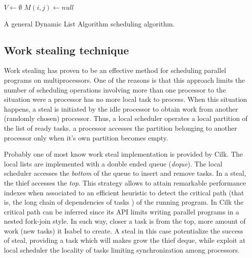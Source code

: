 \documentclass{sig-alternate}
\begin{document}
\begin{algorithm} \label{algo:dls}


 $V \longleftarrow \emptyset$  
 $M(i,j) \longleftarrow null$     
 
\caption{A general Dynamic List Algorithm scheduling algorithm.}
\end{algorithm}

\subsection{Work stealing technique}
  
Work stealing has proven \cite{blelloch} to be an effective method for scheduling parallel programs on multiprocessors. One of the reasons is that this approach limits the number of scheduling operations involving more than one processor to the situation were a processor has no more local task to process. When this situation happens, a steal is initiated by the idle processor to obtain work from another (randomly chosen) processor. Thus, a local scheduler operates a local partition of the list of ready tasks. a processor accesses the partition belonging to another processor only when it's own partition becomes empty.
 
Probably one of most know work steal implementation is provided by Cilk. The local lists are implemented with a double ended queue ({\em deque}). The local scheduler accesses the {\em bottom} of the queue to insert and remove tasks. In a steal, the thief accesses the {\em top}. This strategy allows to attain remarkable performance indexes when associated to an efficient heuristic to detect the critical path (that is, the long chain of dependencies of tasks \cite{Graham}) of the running program. In Cilk the critical path can be inferred since its API limits writing parallel programs in a nested fork-join style. In such way, closer a task is from the top, more amount of work (new tasks) it Isabel to create. A steal in this case potentialize the success of steal, providing a task which will makes grow the thief deque, while exploit at local scheduler the locality of tasks limiting synchronization among processors.
\end{document}
